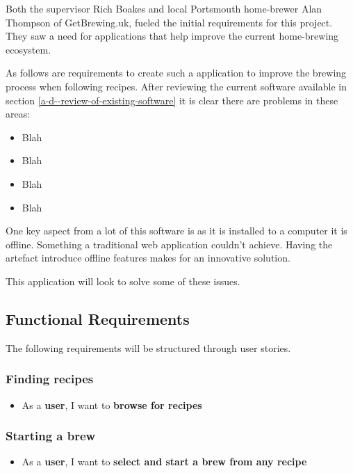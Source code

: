Both the supervisor Rich Boakes and local Portsmouth home-brewer Alan Thompson of GetBrewing.uk, fueled the initial requirements for this project. They saw a need for applications that help improve the current home-brewing ecosystem.

As follows are requirements to create such a application to improve the brewing process when following recipes. After reviewing the current software available in section \ref{a-d--review-of-existing-software} it is clear there are problems in these areas:

\begin{itemize}
  \item Blah
  \item Blah
  \item Blah
  \item Blah
\end{itemize}

One key aspect from a lot of this software is as it is installed to a computer it is offline. Something a traditional web application couldn't achieve. Having the artefact introduce offline features makes for an innovative solution.

This application will look to solve some of these issues.

\subsection{Functional Requirements} \label{a-d--requirements--functional}

The following requirements will be structured through user stories. %

\subsubsection{Finding recipes}

\begin{itemize}
  \item As a \textbf{user}, I want to \textbf{browse for recipes}
\end{itemize}

\subsubsection{Starting a brew}

\begin{itemize}
  \item As a \textbf{user}, I want to \textbf{select and start a brew from any recipe}
\end{itemize}

